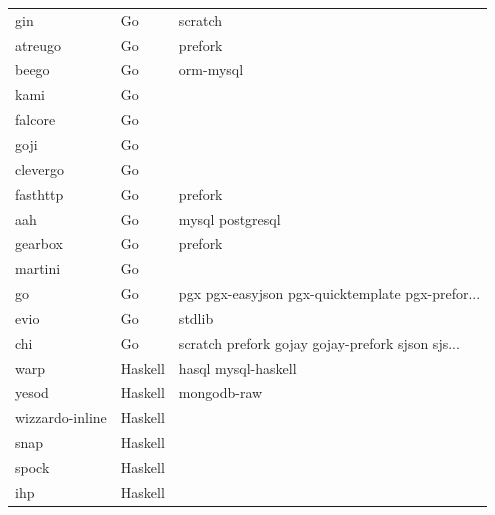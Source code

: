 \begin{longtable}{lll}
    gin              & Go          & scratch                                            \\
    atreugo          & Go          & prefork                                            \\
    beego            & Go          & orm-mysql                                          \\
    kami             & Go          &                                                    \\
    falcore          & Go          &                                                    \\
    goji             & Go          &                                                    \\
    clevergo         & Go          &                                                    \\
    fasthttp         & Go          & prefork                                            \\
    aah              & Go          & mysql postgresql                                   \\
    gearbox          & Go          & prefork                                            \\
    martini          & Go          &                                                    \\
    go               & Go          & pgx pgx-easyjson pgx-quicktemplate pgx-prefor...   \\
    evio             & Go          & stdlib                                             \\
    chi              & Go          & scratch prefork gojay gojay-prefork sjson sjs...   \\
    warp             & Haskell     & hasql mysql-haskell                                \\
    yesod            & Haskell     & mongodb-raw                                        \\
    wizzardo-inline  & Haskell     &                                                    \\
    snap             & Haskell     &                                                    \\
    spock            & Haskell     &                                                    \\
    ihp              & Haskell     &                                                    \\

\end{longtable}
